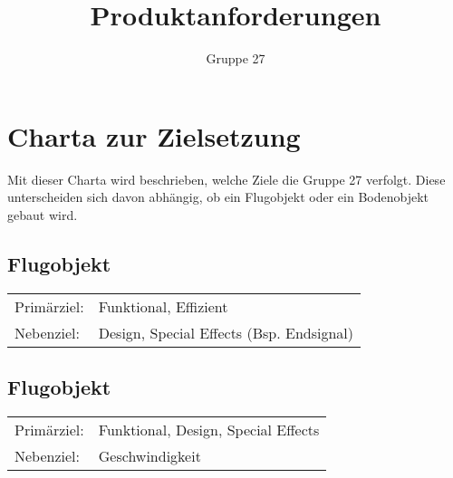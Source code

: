 \documentclass[a4paper,10pt,fleqn]{article}
\title{Produktanforderungen}
\author{Gruppe 27}
\begin{document}

\section*{Charta zur Zielsetzung}
Mit dieser Charta wird beschrieben, welche Ziele die Gruppe 27 verfolgt. 
Diese unterscheiden sich davon abhängig, ob ein Flugobjekt oder ein 
Bodenobjekt gebaut wird. 

\subsection*{Flugobjekt}
\begin{tabular}{@{}ll}
    Primärziel: & Funktional, Effizient \\
    Nebenziel:  & Design, Special Effects (Bsp. Endsignal)
\end{tabular}

\subsection*{Flugobjekt}
\begin{tabular}{@{}ll}
    Primärziel: & Funktional, Design, Special Effects \\
    Nebenziel:  & Geschwindigkeit
\end{tabular}
\end{document}
